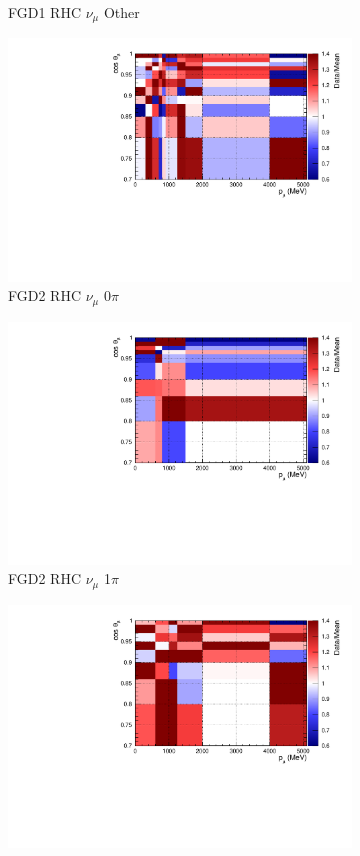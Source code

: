 \begin{figure}
\begin{subfigure}{.32\textwidth}
  \caption{FGD1 RHC $\nu_{\mu}$ Other}
  \label{fig:priorpred_FGD1_NuMuBkg_CCOther_in_AntiNu_Mode}
\end{subfigure}
\begin{subfigure}{.32\textwidth}
  \centering
  \includegraphics[width=0.85\linewidth]{figs/priorpred_FGD2_NuMuBkg_CC0pi_in_AntiNu_Mode.pdf}
  \caption{FGD2 RHC $\nu_{\mu}$ 0$\pi$}
  \label{fig:priorpred_FGD2_NuMuBkg_CC0pi_in_AntiNu_Mode}
\end{subfigure}
\begin{subfigure}{.32\textwidth}
  \centering
  \includegraphics[width=0.85\linewidth]{figs/priorpred_FGD2_NuMuBkg_CC1pi_in_AntiNu_Mode.pdf}
  \caption{FGD2 RHC $\nu_{\mu}$ 1$\pi$}
  \label{fig:priorpred_FGD2_NuMuBkg_CC1pi_in_AntiNu_Mode}
\end{subfigure}
\begin{subfigure}{.32\textwidth}
  \centering
  \includegraphics[width=0.85\linewidth]{figs/priorpred_FGD2_NuMuBkg_CCOther_in_AntiNu_Mode.pdf}

\end{subfigure}
\end{figure}
